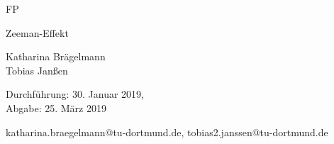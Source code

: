 \newcommand{\Titel}{Zeeman-Effekt}
\newcommand{\DatumDu}{30. Januar 2019}
\newcommand{\DatumAb}{25. März 2019}
\newcommand{\Autoreins}{Katharina Brägelmann}
\newcommand{\Emaileins}{katharina.braegelmann@tu-dortmund.de}
\newcommand{\Autorzwei}{Tobias Janßen}
\newcommand{\Emailzwei}{tobias2.janssen@tu-dortmund.de}



\begin{titlepage}

\begin{center} \large

  FP
  \vspace*{2.5cm}

  {\huge \Titel}
  \vspace*{3cm}

  \Autoreins
  \\\Autorzwei
  \vspace*{1.5cm}

  Durchführung: \DatumDu,\\
  Abgabe: \DatumAb
  \vspace*{10cm}


  \Emaileins, \Emailzwei


\end{center}
\end{titlepage}
